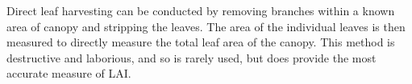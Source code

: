 \documentclass[11pt,a4paper]{article}
\begin{document}
Direct leaf harvesting can be conducted by removing branches within a known area of canopy and stripping the leaves. The area of the individual leaves is then measured to directly measure the total leaf area of the canopy. This method is destructive and laborious, and so is rarely used, but does provide the most accurate measure of LAI.

\printbibliography
\end{document}

